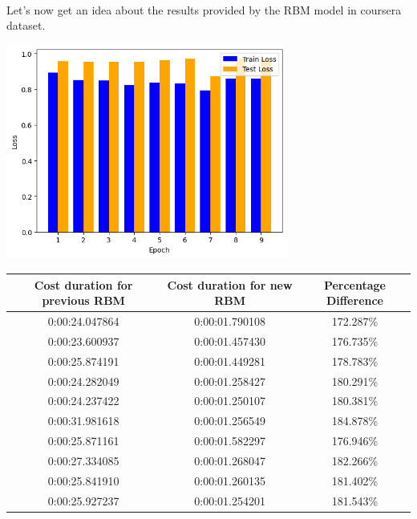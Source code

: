 \documentclass{cup-pan}
\begin{document}
\paragraph{}
Let's now get an idea about the results provided by the RBM model in coursera dataset.
\begin{center}
  \includegraphics[width=350px]{imgs/figures/35.png}
  \vspace{.1cm}
\end{center}
\vspace*{.3cm}
\begin{center}
  \begin{tabular}{|c|c|c|}
    \hline 
    \textbf{Cost duration for previous RBM} & \textbf{Cost duration for new RBM} & \textbf{Percentage Difference}\\
    \hline 
    0:00:24.047864 & 0:00:01.790108 & 172.287\% \\
    0:00:23.600937 & 0:00:01.457430 & 176.735\% \\
    0:00:25.874191 & 0:00:01.449281 & 178.783\% \\
    0:00:24.282049 & 0:00:01.258427 & 180.291\% \\
    0:00:24.237422 & 0:00:01.250107 & 180.381\% \\
    0:00:31.981618 & 0:00:01.256549 & 184.878\% \\
    0:00:25.871161 & 0:00:01.582297 & 176.946\% \\
    0:00:27.334085 & 0:00:01.268047 & 182.266\% \\
    0:00:25.841910 & 0:00:01.260135 & 181.402\% \\
    0:00:25.927237 & 0:00:01.254201 & 181.543\% \\
    \hline
  \end{tabular}
\end{center}
\end{document}
